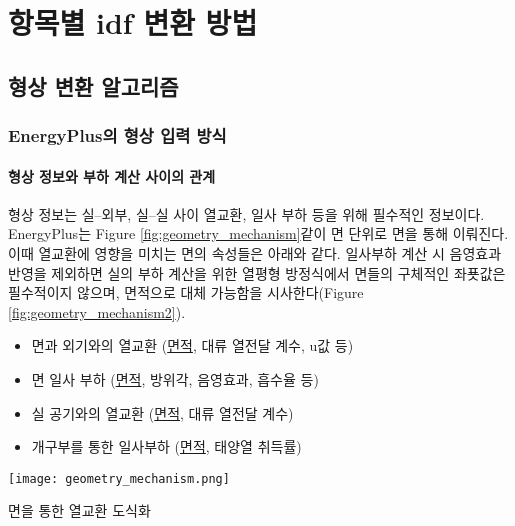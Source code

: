
\chapter{항목별 idf 변환 방법}
\label{chap:simulator_geometry}

\section{형상 변환 알고리즘}

\subsection{EnergyPlus의 형상 입력 방식}

\subsubsection{형상 정보와 부하 계산 사이의 관계}

형상 정보는 실--외부, 실--실 사이 열교환, 일사 부하 등을 위해 필수적인 정보이다. EnergyPlus는 Figure \ref{fig:geometry_mechanism}\과 같이 면 단위로  면을 통해 이뤄진다. 이때 열교환에 영향을 미치는 면의 속성들은 아래와 같다. 일사부하 계산 시 음영효과 반영을 제외하면 실의 부하 계산을 위한 열평형 방정식에서 면들의 구체적인 좌푯값은 필수적이지 않으며, 면적으로 대체 가능함을 시사한다(Figure \ref{fig:geometry_mechanism2}).

\begin{itemize}
  \item 면과 외기와의 열교환 (\underline{면적}, 대류 열전달 계수, u값 등)
  \item 면 일사 부하 (\underline{면적}, 방위각, 음영효과, 흡수율 등)
  \item 실 공기와의 열교환 (\underline{면적}, 대류 열전달 계수)
  \item 개구부를 통한 일사부하 (\underline{면적}, 태양열 취득률)
\end{itemize}

\begin{defaultfigure}
  \texttt{[image: geometry\_mechanism.png]}
  \caption{면을 통한 열교환 도식화}
  \label{fig:geometry_mechanism}
\end{defaultfigure}

